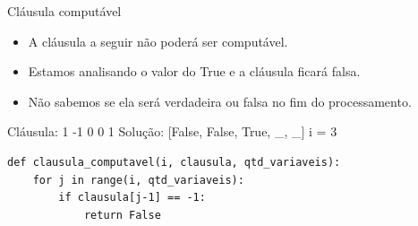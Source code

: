 \documentclass[compress,aspectratio=169]{beamer}
\begin{document}
    \begin{frame}[fragile]{Cláusula computável}
        \begin{itemize}
            \item A cláusula a seguir não poderá ser computável.
            \item Estamos analisando o valor do True e a cláusula ficará falsa.
            \item Não sabemos se ela será verdadeira ou falsa no fim do processamento.
        \end{itemize}
        \begin{tcolorbox}[width=\linewidth, fontupper=\ttfamily,  halign=flush left]
            Cláusula: 1 -1 0 0 1 \newline 
            Solução: [False, False, True, \_, \_] \newline
            i = 3
        \end{tcolorbox}
        \begin{lstlisting}
def clausula_computavel(i, clausula, qtd_variaveis):  
    for j in range(i, qtd_variaveis):
        if clausula[j-1] == -1:
            return False
        \end{lstlisting}
    \end{frame}
\end{document}
